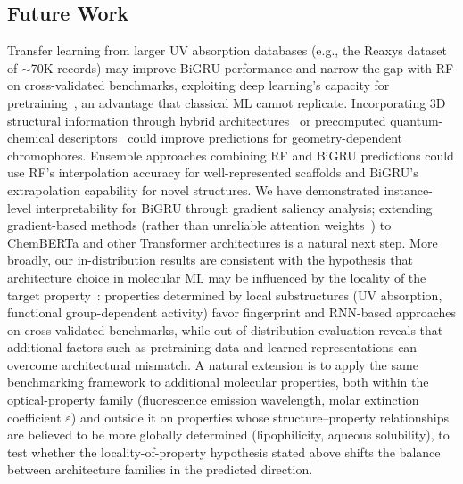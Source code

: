 \documentclass[journal=jcisd8,manuscript=article]{achemso}
\begin{document}
\subsection*{Future Work}
Transfer learning from larger UV absorption databases (e.g., the Reaxys dataset of $\sim$70K records) may improve BiGRU performance and narrow the gap with RF on cross-validated benchmarks, exploiting deep learning's capacity for pretraining~\cite{vermeire2021transfer}, an advantage that classical ML cannot replicate.
Incorporating 3D structural information through hybrid architectures~\cite{gilmer2017neural} or precomputed quantum-chemical descriptors~\cite{lupopasini2023excited} could improve predictions for geometry-dependent chromophores.
Ensemble approaches combining RF and BiGRU predictions could use RF's interpolation accuracy for well-represented scaffolds and BiGRU's extrapolation capability for novel structures.
We have demonstrated instance-level interpretability for BiGRU through gradient saliency analysis; extending gradient-based methods (rather than unreliable attention weights~\cite{jain2019attention}) to ChemBERTa and other Transformer architectures is a natural next step.
More broadly, our in-distribution results are consistent with the hypothesis that architecture choice in molecular ML may be influenced by the locality of the target property~\cite{chenMolecularLanguage2023, jiang2023trangru}: properties determined by local substructures (UV absorption, functional group-dependent activity) favor fingerprint and RNN-based approaches on cross-validated benchmarks, while out-of-distribution evaluation reveals that additional factors such as pretraining data and learned representations can overcome architectural mismatch.
A natural extension is to apply the same benchmarking framework to additional molecular properties, both within the optical-property family (fluorescence emission wavelength, molar extinction coefficient $\varepsilon$) and outside it on properties whose structure--property relationships are believed to be more globally determined (lipophilicity, aqueous solubility), to test whether the locality-of-property hypothesis stated above shifts the balance between architecture families in the predicted direction.
\end{document}
